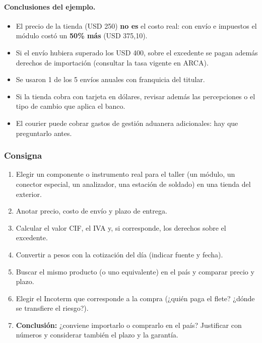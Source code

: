 \paragraph*{Conclusiones del ejemplo.}
\begin{itemize}
  \item El precio de la tienda (USD 250) \textbf{no es} el costo real: con envío e impuestos el
        módulo costó un \textbf{50\% más} (USD 375,10).
  \item Si el envío hubiera superado los USD 400, sobre el excedente se pagan además derechos
        de importación (consultar la tasa vigente en ARCA).
  \item Se usaron 1 de los 5 envíos anuales con franquicia del titular.
  \item Si la tienda cobra con tarjeta en dólares, revisar además las percepciones o el tipo de
        cambio que aplica el banco.
  \item El courier puede cobrar gastos de gestión aduanera adicionales: hay que preguntarlo antes.
\end{itemize}

\subsubsection*{Consigna}
\begin{enumerate}
  \item Elegir un componente o instrumento real para el taller (un módulo, un conector
        especial, un analizador, una estación de soldado) en una tienda del exterior.
  \item Anotar precio, costo de envío y plazo de entrega.
  \item Calcular el valor CIF, el IVA y, si corresponde, los derechos sobre el excedente.
  \item Convertir a pesos con la cotización del día (indicar fuente y fecha).
  \item Buscar el mismo producto (o uno equivalente) en el país y comparar precio y plazo.
  \item Elegir el Incoterm que corresponde a la compra (¿quién paga el flete? ¿dónde se
        transfiere el riesgo?).
  \item \textbf{Conclusión:} ¿conviene importarlo o comprarlo en el país? Justificar con
        números y considerar también el plazo y la garantía.
\end{enumerate}


